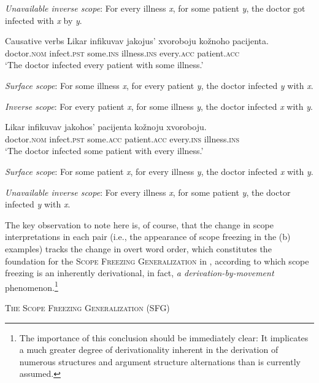 \documentclass[output=paper,colorlinks,citecolor=brown]{langscibook}
\begin{document}
\textit{Unavailable inverse scope}: For every illness \textit{x}, for some patient \textit{y}, the doctor got infected with \textit{x} by \textit{y}.
    \z
\z

\ea%
    \label{ex:antonyuk:10}
Causative verbs
\ea \label{ex:antonyuk:10a}
\gll   Likar   infikuvav   jakojus’ xvoroboju   kožnoho pacijenta.\\
  doctor.\textsc{nom} infect.\textsc{pst}  some.\textsc{ins} illness.\textsc{ins}  every.\textsc{acc} patient.\textsc{acc}\\
\glt `The doctor infected every patient with some illness.’

\textit{Surface scope}: For some illness \textit{x}, for every patient \textit{y}, the doctor infected \textit{y} with \textit{x}.

\textit{Inverse scope}: For every patient \textit{x}, for some illness \textit{y}, the doctor infected \textit{x} with \textit{y}.

\ex \label{ex:antonyuk:10b}
\gll   Likar   infikuvav   jakohos’ pacijenta   kožnoju xvoroboju.\\
  doctor.\textsc{nom} infect.\textsc{pst}  some.\textsc{acc} patient.\textsc{acc}  every.\textsc{ins} illness.\textsc{ins}\\
\glt `The doctor infected some patient with every illness.’

\textit{Surface scope}: For some patient \textit{x}, for every illness \textit{y}, the doctor infected \textit{x} with \textit{y}.

\textit{Unavailable inverse scope}: For every illness \textit{x}, for some patient \textit{y}, the doctor infected \textit{y} with \textit{x}.
    \z
\z

\noindent The key observation to note here is, of course, that the change in scope interpretations in each pair (i.e., the appearance of scope freezing in the (b) examples) tracks the change in overt word order, which constitutes the foundation for the \textsc{Scope Freezing Generalization} in , according to which scope freezing is an inherently derivational, in fact, \textit{a derivation-by-movement} phenomenon.\footnote{\textrm{The importance of this conclusion should be immediately clear: It implicates a much greater degree of derivationality inherent in the derivation of numerous structures and argument structure alternations than is currently assumed.}} 


\eanoraggedright%
    \label{ex:antonyuk:11}

           \textsc{The Scope Freezing Generalization} (SFG)  \citep{Antonyuk2015}
\end{document}
